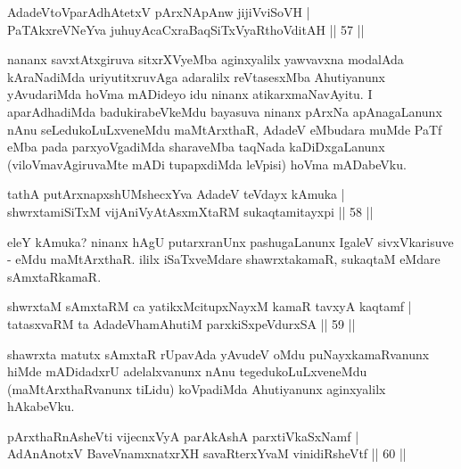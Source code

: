 \begin{shl}
AdadeV\s toV\s parAdhAtetxV pArxNApAnw jijiVviSoVH | \\
PaTAkxreVNeYva juhuyAcaCxraBaqSiTxVyaRthoVditAH \hfill|| 57 || 
\end{shl}

\begin{artha}
nananx savxtAtxgiruva sitxrXVyeMba aginxyalilx yawvavxna modalAda kAraNadiMda uriyutitxruvAga adaralilx reVtasesxMba Ahutiyanunx yAvudariMda hoVma mADideyo idu ninanx atikarxmaNavAyitu. I aparAdhadiMda badukirabeVkeMdu bayasuva ninanx pArxNa apAnagaLanunx nAnu seLedukoLuLxveneMdu maMtArxthaR, AdadeV eMbudara muMde PaTf eMba pada parxyoVgadiMda sharaveMba taqNada kaDiDxgaLanunx (viloVmavAgiruvaMte mADi tupapxdiMda leVpisi) hoVma mADabeVku.
\end{artha}


\begin{shl}
tathA putArxnapxshUMshecxYva AdadeV teV\s dayx kAmuka | \\
shwrxtamiSiTxM vijAniVyAtAsxmXtaRM sukaqtamitayxpi \hfill|| 58 || 
\end{shl}

\begin{artha}
eleY kAmuka? ninanx hAgU putarxranUnx pashugaLanunx IgaleV sivxVkarisuve - eMdu maMtArxthaR. ililx iSaTxveMdare shawrxtakamaR, sukaqtaM eMdare sAmxtaRkamaR.
\end{artha}

\begin{shl}
shwrxtaM sAmxtaRM ca yatikxMcitupxNayxM kamaR tavxyA kaqtamf | \\
tatasxvaRM ta AdadeV\s hamAhutiM parxkiSxpeVdurxSA \hfill|| 59 || 
\end{shl}

\begin{artha}
shawrxta matutx sAmxtaR rUpavAda yAvudeV oMdu puNayxkamaRvanunx hiMde mADidadxrU adelalxvanunx nAnu tegedukoLuLxveneMdu (maMtArxthaRvanunx tiLidu) koVpadiMda Ahutiyanunx aginxyalilx hAkabeVku.
\end{artha}

\begin{shl}
pArxthaRnA\s \s sheVti vijecnxVyA parAkAshA parxtiVkaSxNamf | \\
AdAnAnotxV BaveVnamxnatxrXH savaRterxYvaM vinidiRsheVtf \hfill|| 60 || 
\end{shl}

